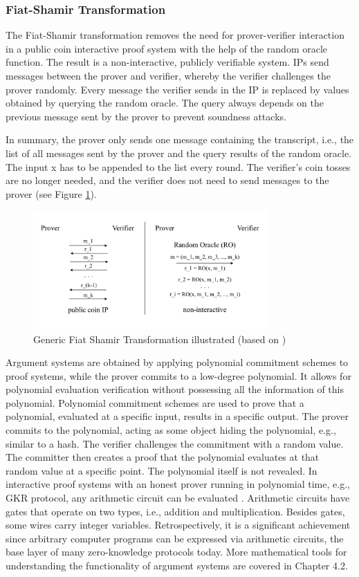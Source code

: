 \subsubsection{Fiat-Shamir Transformation}
The Fiat-Shamir transformation \citep{ROMFiat1986HowTP} removes the need for prover-verifier interaction in a public coin interactive proof system with the help of the random oracle function. The result is a non-interactive, publicly verifiable system. IPs send messages between the prover and verifier, whereby the verifier challenges the prover randomly. Every message the verifier sends in the IP is replaced by values obtained by querying the random oracle. The query always depends on the previous message sent by the prover to prevent soundness attacks.

In summary, the prover only sends one message containing the transcript, i.e., the list of all messages sent by the prover and the query results of the random oracle. The input x has to be appended to the list every round. The verifier's coin tosses are no longer needed, and the verifier does not need to send messages to the prover (see Figure \ref{fig:FST}).
\begin{figure}[hbt]
	\centering
		\includegraphics[width=0.8\textwidth]{Pictures/FST.png}
	\caption{Generic Fiat Shamir Transformation illustrated (based on \citet{Thaler})}
	\label{fig:FST}
\end{figure}
Argument systems are obtained by applying polynomial commitment schemes to proof systems, while the prover commits to a low-degree polynomial. It allows for polynomial evaluation verification without possessing all the information of this polynomial. Polynomial commitment schemes are used to prove that a polynomial, evaluated at a specific input, results in a specific output. The prover commits to the polynomial, acting as some object hiding the polynomial, e.g., similar to a hash. The verifier challenges the commitment with a random value. The committer then creates a proof that the polynomial evaluates at that random value at a specific point. The polynomial itself is not revealed. In interactive proof systems with an honest prover running in polynomial time, e.g., GKR protocol, any arithmetic circuit can be evaluated \citep{GKR10.1145/1374376.1374396}. Arithmetic circuits have gates that operate on two types, i.e., addition and multiplication. Besides gates, some wires carry integer variables. Retrospectively, it is a significant achievement since arbitrary computer programs can be expressed via arithmetic circuits, the base layer of many zero-knowledge protocols today. More mathematical tools for understanding the functionality of argument systems are covered in Chapter 4.2.
